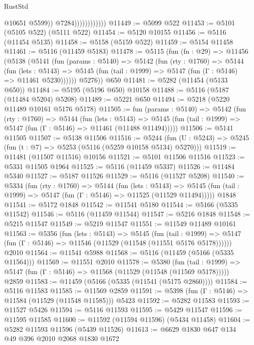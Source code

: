 \begin{lexlean}{RustStd}
\begin{coremodule}
                                @10651
                                @5599))
                            @7284))))))))))))
@11449 := @5099 @522
@11453 := @5101 (@5105 @522) (@5111 @522)
@11454 := @5120 @10155
@11456 := @5116 (@11454 @5135)
@11458 := @5158 (@5159 @522)
@11459 := @5154 @11458
@11461 := @5116 (@11459 @5183)
@11478 := @5115
    (fun (fn : @29) =>
    @11456
      (@5138
        (@5141
          (fun (params : @5140) =>
          @5142
            (fun (rty : @1760) =>
            @5144
              (fun (lets : @5143) =>
              @5145 (fun (tail : @1999) => @5147 (fun (Γ : @5146) => @11461 @5230))))))
        @5276))
    @650
@11481 := @5282 (@11454 (@5133 @650))
@11484 := @5195 (@5196 @650) @10158
@11488 := @5116 (@5187 (@11484 @5204) @5208)
@11489 := @5221 @650
@11494 := @5218 (@5220 @11489 @10161 @5176 @5178)
@11505 := fun (params : @5140) =>
  @5142
    (fun (rty : @1760) =>
    @5144
      (fun (lets : @5143) =>
      @5145 (fun (tail : @1999) => @5147 (fun (Γ : @5146) => @11461 (@11488 @11494)))))
@11506 := @5141 @11505
@11507 := @5138 @11506
@11516 := @5244
    (fun (U : @5243) => @5245 (fun (t : @7) => @5253 (@5116 (@5259 @10158 @5134) @5270)))
@11519 := @11481 (@11507 @11516) @10156
@11521 := @5101 @11506 @11516
@11523 := @5331 @11505 @1964
@11525 := @5116 (@11459 @5337)
@11526 := @11484 @5340
@11527 := @5187 @11526
@11529 := @5116 (@11527 @5208)
@11540 := @5334
    (fun (rty : @1760) =>
    @5144
      (fun (lets : @5143) =>
      @5145 (fun (tail : @1999) => @5147 (fun (Γ : @5146) => @11525 (@11529 @11494)))))
    @1848
@11541 := @5172 @1848
@11542 := @11541 @5180
@11544 := @5166 (@5335 @11542)
@11546 := @5116 (@11459 @11544)
@11547 := @5216 @1848
@11548 := @5215 @11547
@11549 := @5219 @11547
@11551 := @11549 @11489 @10161
@11563 := @5356
    (fun (lets : @5143) =>
    @5145
      (fun (tail : @1999) =>
      @5147 (fun (Γ : @5146) => @11546 (@11529 (@11548 (@11551 @5176 @5178))))))
    @2010
@11564 := @11541 @5988
@11568 := @5116 (@11459 (@5166 (@5335 @11564)))
@11569 := @11551 @2010
@11578 := @5380
    (fun (tail : @1999) => @5147 (fun (Γ : @5146) => @11568 (@11529 (@11548 (@11569 @5178)))))
    @2859
@11583 := @11459 (@5166 (@5335 (@11541 (@5175 @2860))))
@11584 := @5116 @11583
@11585 := @11569 @2859
@11591 := @5398 (fun (Γ : @5146) => @11584 (@11529 (@11548 @11585))) @5423
@11592 := @5282 @11583
@11593 := @11527 @5426
@11594 := @5116 @11593
@11595 := @5429 @11547
@11596 := @11595 @11585
@11600 := @11592 (@11594 @11596) (@5434 @11458)
@11604 := @5282 @11593 @11596 (@5439 @11526)
@11613 := @6629 @1830 @647 @134 @49 @396 @2010 @2068 @1830 @1672

\end{coremodule}
\end{lexlean}
